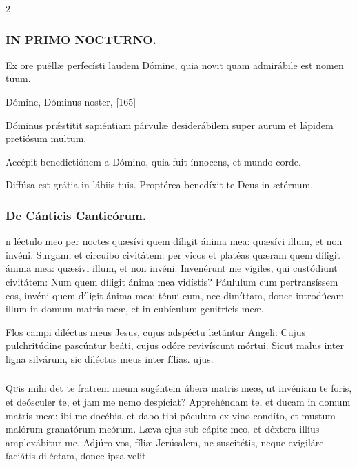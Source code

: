 \documentclass[9pt,twoside]{extarticle}
\begin{document}
\begin{multicols}{2}
\subsubsection*{\center \textsc{IN PRIMO NOCTURNO.}}
\begin{tightlist}{}
\item {} Ex ore puéllæ perfecísti laudem Dómine, quia novit quam admirábile est nomen tuum.
\item {} Dómine, Dóminus noster,  [165]
\item {} Dóminus prǽstitit sapiéntiam párvulæ desiderábilem super aurum et lápidem pretiósum multum.
\item {} Accépit benedictiónem a Dómino, quia fuit ínnocens, et mundo corde.
\item {} Diffúsa est grátia in lábiis tuis.  Proptérea benedíxit te Deus in ætérnum.
\item {}
\end{tightlist}

\subsubsection*{\center De Cánticis Canticórum.}
n léctulo meo per noctes quæsívi quem díligit ánima mea: quæsívi illum, et non invéni. Surgam, et circuíbo civitátem: per vicos et platéas quæram quem díligit ánima mea: quæsívi illum, et non invéni. Invenérunt me vígiles, qui custódiunt civitátem: Num quem díligit ánima mea vidístis? Páululum cum pertransíssem eos, invéni quem díligit ánima mea: ténui eum, nec dimíttam, donec introdúcam illum in domum matris meæ, et in cubículum genitrícis meæ.

\begin{tightlist}{}
\item {} Flos campi diléctus meus Jesus, cujus adspéctu lætántur Angeli: \textred{*} Cujus pulchritúdine pascúntur beáti, cujus odóre revivíscunt mórtui.  Sicut malus inter ligna silvárum, sic diléctus meus inter fílias. ujus.
\end{tightlist}

\subsubsection*{\center {}}
\lettrine{Q}uis mihi det te fratrem meum sugéntem úbera matris meæ, ut invéniam te foris, et deósculer te, et jam me nemo despíciat? Apprehéndam te, et ducam in domum matris meæ: ibi me docébis, et dabo tibi póculum ex vino condíto, et mustum malórum granatórum meórum. Læva ejus sub cápite meo, et déxtera illíus amplexábitur me. Adjúro vos, fíliæ Jerúsalem, ne suscitétis, neque evigiláre faciátis diléctam, donec ipsa velit.


\end{multicols}
\end{document}
